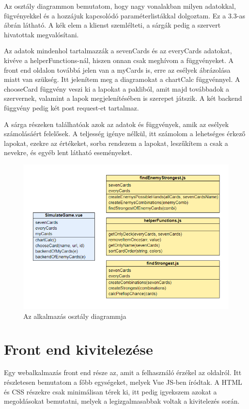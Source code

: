 Az osztály diagrammon bemutatom, hogy nagy vonalakban milyen adatokkal, fügvényekkel és a hozzájuk kapcsolódó paraméterlistákkal dolgoztam. Ez a 3.3-as ábrán látható. A kék elem a klienst szemlélteti, a sárgák pedig a szervert hivatottak megvalósítani.

Az adatok mindenhol tartalmazzák a sevenCards és az everyCards adatokat, kivéve a helperFunctions-nál, hiszen onnan csak meghívom a függvényeket. A front end oldalon továbbá jelen van a myCards is, erre az esélyek ábrázolása miatt van szükség. Itt jelenítem meg a diagramokat a chartCalc függvénnyel. A chooseCard függvény veszi ki a lapokat a pakliból, amit majd továbbadok a szervernek, valamint a lapok megjelenítésében is szerepet játszik. A két backend függvény pedig két post request-et tartalmaz.

A sárga részeken találhatóak azok az adatok és függvények, amik az esélyek számolásáért felelősek. A teljesség igénye nélkül, itt számolom a lehetséges érkező lapokat, ezekre az értékeket, sorba rendezem a lapokat, leszűkítem a csak a nevekre, és egyéb lent látható eseményeket.

\begin{figure}[h]
\centering
\includegraphics[scale=0.9]{images/class-model.png}
\caption{Az alkalmazás osztály diagrammja}
\label{fig:class-model}
\end{figure}

\section{Front end kivitelezése}
Egy webalkalmazás front end része az, amit a felhasználó érzékel az oldalról. Itt részletesen bemutatom a főbb egységeket, melyek Vue JS-ben íródtak. A HTML és CSS részekre csak minimálisan térek ki, itt pedig igyekszem azokat a megoldásokat bemutatni, melyek a legizgalmasabbak voltak a kivitelezés során. 

